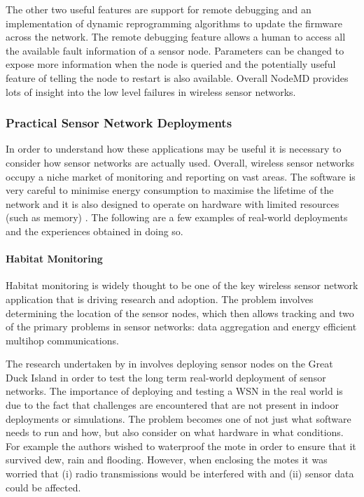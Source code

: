 The other two useful features are support for remote debugging and an implementation of dynamic reprogramming algorithms to update the firmware across the network. The remote debugging feature allows a human to access all the available fault information of a sensor node. Parameters can be changed to expose more information when the node is queried and the potentially useful feature of telling the node to restart is also available. Overall NodeMD provides lots of insight into the low level failures in wireless sensor networks.


\subsubsection{Practical Sensor Network Deployments}
\label{sec:lit-review-practical-experience}
In order to understand how these applications may be useful it is necessary to consider how sensor networks are actually used. Overall, wireless sensor networks occupy a niche market of monitoring and reporting on vast areas. The software is very careful to minimise energy consumption to maximise the lifetime of the network \cite{TankBible} and it is also designed to operate on hardware with limited resources (such as memory) \cite{1368897}. The following are a few examples of real-world deployments and the experiences obtained in doing so.


\paragraph{Habitat Monitoring} Habitat monitoring is widely thought to be one of the key wireless sensor network application that is driving research and adoption. The problem involves determining the location of the sensor nodes, which then allows tracking \cite{Cerpa:2001:HMA:844193.844196} and two of the primary problems in sensor networks: data aggregation and energy efficient multihop communications.

The research undertaken by \citeauthor{SzewczykPMC04} in \cite{SzewczykPMC04} involves deploying sensor nodes on the Great Duck Island in order to test the long term real-world deployment of sensor networks. The importance of deploying and testing a WSN in the real world is due to the fact that challenges are encountered that are not present in indoor deployments or simulations. The problem becomes one of not just what software needs to run and how, but also consider on what hardware in what conditions. For example the authors wished to waterproof the mote in order to ensure that it survived dew, rain and flooding. However, when enclosing the motes it was worried that (i) radio transmissions would be interfered with and (ii) sensor data could be affected.

